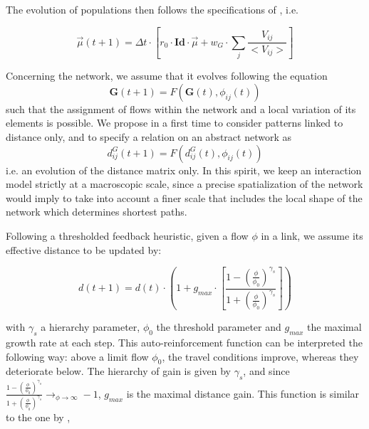 The evolution of populations then follows the specifications of \cite{raimbault2018indirect}, i.e.

\begin{equation}
\vec{\mu}(t+1)=\Delta t\cdot \left[ r_0\cdot \mathbf{Id}\cdot \vec{\mu} + w_G\cdot \sum_j \frac{V_{ij}}{<V_{ij}>}\right]
\end{equation}

Concerning the network, we assume that it evolves following the equation
\begin{equation}
\mathbf{G}(t + 1) = F(\mathbf{G}(t),\phi_{ij}(t))
\end{equation}
such that the assignment of flows within the network and a local variation of its elements is possible. We propose in a first time to consider patterns linked to distance only, and to specify a relation on an abstract network as
\begin{equation}
d^G_{ij}(t+1) = F(d^G_{ij}(t),\phi_{ij}(t))
\end{equation}
i.e. an evolution of the distance matrix only. In this spirit, we keep an interaction model strictly at a macroscopic scale, since a precise spatialization of the network would imply to take into account a finer scale that includes the local shape of the network which determines shortest paths.



Following a thresholded feedback heuristic, given a flow $\phi$ in a link, we assume its effective distance to be updated by:

\begin{equation}
d(t+1) = d(t)\cdot \left( 1 + g_{max} \cdot \left[\frac{1 - \left(\frac{\phi}{\phi_0}\right)^{\gamma_s}}{1 + \left(\frac{\phi}{\phi_0}\right)^{\gamma_s}}\right]\right)
\end{equation}

with $\gamma_s$ a hierarchy parameter, $\phi_0$ the threshold parameter and $g_{max}$ the maximal growth rate at each step. This auto-reinforcement function can be interpreted the following way: above a limit flow $\phi_0$, the travel conditions improve, whereas they deteriorate below. The hierarchy of gain is given by $\gamma_s$, and since $\frac{1 - \left(\frac{\phi}{\phi_0}\right)^{\gamma_s}}{1 + \left(\frac{\phi}{\phi_0}\right)^{\gamma_s}} \rightarrow_{\phi\rightarrow \infty} -1$, $g_{max}$ is the maximal distance gain. This function is similar to the one  by \cite{tero2007mathematical}, 



